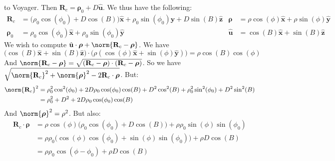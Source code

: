 \documentclass[crop=false,class=article,oneside]{standalone}
\begin{document}
            to Voyager. Then
            $\mathbf{R}_{c}%
             =\boldsymbol{\rho}_{0}+D\hat{\mathbf{u}}$.
            We thus have the following:
            \begin{align*}
                \mathbf{R}_{c}
                &=\big(
                    \rho_{0}\cos(\phi_0)+D\cos(B)
                \big)\hat{\mathbf{x}}+
                \rho_{0}\sin(\phi_{0})\hat{\mathbf{y}}+
                D\sin(B)\hat{\mathbf{z}}
                &
                \boldsymbol{\rho}
                &=\rho\cos(\phi)\hat{\mathbf{x}}+
                \rho\sin(\phi)\hat{\mathbf{y}}\\
                \boldsymbol{\rho}_{0}
                &=\rho_{0}\cos(\phi_0)\hat{\mathbf{x}}+
                \rho_{0}\sin(\phi_{0})\hat{\mathbf{y}}
                &
                \hat{\mathbf{u}}
                &=\cos(B)\hat{\mathbf{x}}+\sin(B)\hat{\mathbf{z}}
            \end{align*}
            We wish to compute
            $\hat{\mathbf{u}}\cdot%
             \boldsymbol{\rho}+%
             \norm{\mathbf{R}_{c}-\boldsymbol{\rho}}$.
             We have
            \begin{equation*}
                \big(
                    \cos(B)\hat{\mathbf{x}}+\sin(B)\hat{\mathbf{z}}
                \big)\cdot\big(
                    \rho(\cos(\phi)\hat{\mathbf{x}}+
                    \sin(\phi)\hat{\mathbf{y}})
                \big)=\rho\cos(B)\cos(\phi)
            \end{equation*}
            And
            $\norm{\mathbf{R}_{c}-\boldsymbol{\rho}}%
             =\sqrt{(\mathbf{R}_{c}-%
                    \boldsymbol{\rho})\cdot(\mathbf{R}_{c}-%
                    \boldsymbol{\rho})}$.
            So we have
            $\sqrt{\norm{\mathbf{R}_{c}}^2+%
             \norm{\boldsymbol{\rho}}^2-%
             2\mathbf{R}_{c}\cdot\boldsymbol{\rho}}$.
            But:
            \begin{align*}
                \norm{\mathbf{R}_{c}}^{2}
                &=\rho_{0}^2\cos^2(\phi_0)+
                  2D\rho_{0}\cos(\phi_0)\cos(B)+D^2\cos^2(B)+
                  \rho_{0}^2\sin^2(\phi_0)+D^2\sin^2(B)\\
                &=\rho_{0}^2+D^2+2D\rho_{0}\cos(\phi_0)\cos(B)
            \end{align*}
            And $\norm{\boldsymbol{\rho}}^2 = \rho^2$. But also:
            \begin{align*}
                \mathbf{R}_{c}\cdot \boldsymbol{\rho} &= \rho\cos(\phi)\big(\rho_{0}\cos(\phi_{0})+D\cos(B)\big)+\rho\rho_{0}\sin(\phi)\sin(\phi_{0})\\
                &= \rho\rho_{0}\big(\cos(\phi)\cos(\phi_{0})+\sin(\phi)\sin(\phi_{0})\big)+\rho D\cos(B)\\
            &= \rho\rho_{0}\cos(\phi-\phi_{0})+\rho D\cos(B)
            \end{align*}
\end{document}
